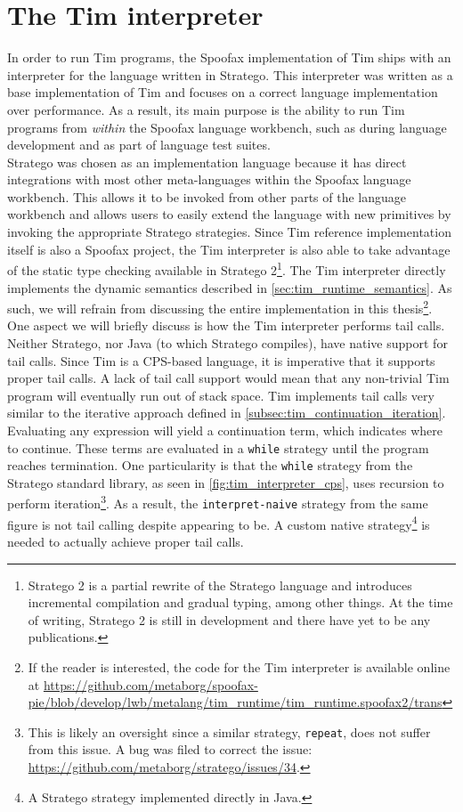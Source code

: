 \section{The Tim interpreter}
\label{sec:tim_interpreter}
In order to run Tim programs, the Spoofax implementation of Tim ships with an interpreter for the language written in Stratego. This interpreter was written as a base implementation of Tim and focuses on a correct language implementation over performance. As a result, its main purpose is the ability to run Tim programs from \textit{within} the Spoofax language workbench, such as during language development and as part of language test suites.\\

Stratego was chosen as an implementation language because it has direct integrations with most other meta-languages within the Spoofax language workbench. This allows it to be invoked from other parts of the language workbench and allows users to easily extend the language with new primitives by invoking the appropriate Stratego strategies. Since Tim reference implementation itself is also a Spoofax project, the Tim interpreter is also able to take advantage of the static type checking available in Stratego 2\footnote{Stratego 2 is a partial rewrite of the Stratego language and introduces incremental compilation and gradual typing, among other things. At the time of writing, Stratego 2 is still in development and there have yet to be any publications.}. The Tim interpreter directly implements the dynamic semantics described in \cref{sec:tim_runtime_semantics}. As such, we will refrain from discussing the entire implementation in this thesis\footnote{If the reader is interested, the code for the Tim interpreter is available online at \url{https://github.com/metaborg/spoofax-pie/blob/develop/lwb/metalang/tim_runtime/tim_runtime.spoofax2/trans}}.\\

One aspect we will briefly discuss is how the Tim interpreter performs tail calls. Neither Stratego, nor Java (to which Stratego compiles), have native support for tail calls. Since Tim is a \ac{CPS}-based language, it is imperative that it supports proper tail calls. A lack of tail call support would mean that any non-trivial Tim program will eventually run out of stack space. Tim implements tail calls very similar to the iterative approach defined in \cref{subsec:tim_continuation_iteration}. Evaluating any expression will yield a continuation term, which indicates where to continue. These terms are evaluated in a \texttt{while} strategy until the program reaches termination. One particularity is that the \texttt{while} strategy from the Stratego standard library, as seen in \cref{fig:tim_interpreter_cps}, uses recursion to perform iteration\footnote{This is likely an oversight since a similar strategy, \texttt{repeat}, does not suffer from this issue. A bug was filed to correct the issue: \url{https://github.com/metaborg/stratego/issues/34}.}. As a result, the \texttt{interpret-naive} strategy from the same figure is not tail calling despite appearing to be. A custom native strategy\footnote{A Stratego strategy implemented directly in Java.} is needed to actually achieve proper tail calls.

